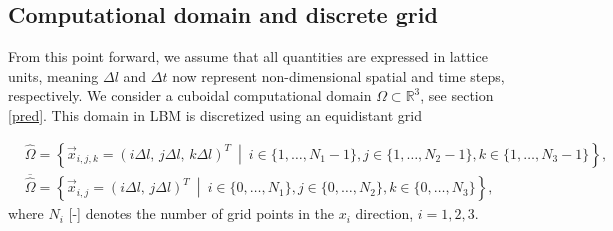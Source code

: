 \subsection{Computational domain and discrete grid}
From this point forward, we assume that all quantities are expressed in lattice units, meaning $ \Delta l $ and $ \Delta t $ now represent non-dimensional spatial and time steps, respectively. We consider a cuboidal computational domain $ \Omega \subset \mathbb{R}^3 $, see section \ref{pred}. This domain in LBM is discretized using an equidistant grid

\begin{subequations}\label{eq:domain}
	\begin{eqnarray}
		&\hat{\Omega} = \left\{ \vec{x}_{i,j,k} = (i \Delta l,\,j \Delta l, \,k \Delta l)^T \ \middle| \ i \in \{1, \dots, N_{1} - 1\}, j \in \{1, \dots, N_{2} - 1 \}, k \in \{1, \dots, N_{3} - 1 \} \right\},\\[4pt]
		&\overline{\hat{\Omega}} = \left\{ \vec{x}_{i,j} = (i \Delta l,\,j \Delta l)^T \ \middle| \ i \in \{0, \dots, N_{1} \}, j \in \{0, \dots, N_{2} \}, k \in \{0, \dots, N_{3} \} \right\},
	\end{eqnarray}
\end{subequations}
where $ N_{i} $ [-] denotes the number of grid points in the $ x_i $ direction, $ i = 1, 2, 3 $.

